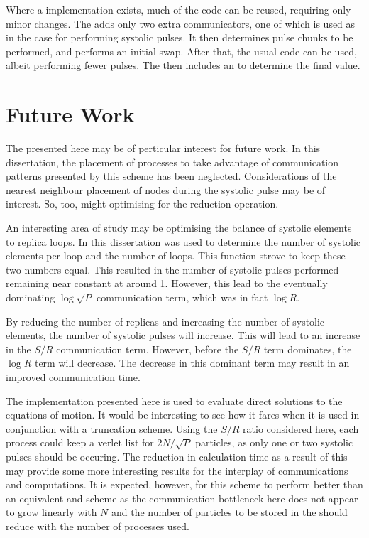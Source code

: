 Where a \systolicloop{} implementation exists, much of the code can
be reused, requiring only minor changes.
%
The \replicatedsystolicloop{} adds only two extra
communicators, one of which is used as in the \systolicloop{} case
for performing systolic pulses.
%
It then determines pulse chunks to be performed, and performs
an initial swap.
%
After that, the usual \systolicloop{} code can be used, albeit performing
fewer pulses.
%
The \replicatedsystolicloop{} then includes an \mpiallreduce{} to determine
the final value.


\section{Future Work}

The \replicatedsystolicloop{} presented here may be of perticular
interest for future work.
%
In this dissertation, the placement of processes to take advantage
of communication patterns presented by this scheme has been neglected.
%
Considerations of the nearest neighbour placement of nodes during the
systolic pulse may be of interest.
%
So, too, might optimising for the reduction operation.

An interesting area of study may be optimising the balance of
systolic elements to replica loops.
%
In this dissertation \mpidimscreate{} was used to determine the
number of systolic elements per loop and the number of loops.
%
This function strove to keep these two numbers equal.
%
This resulted in the number of systolic pulses performed remaining
near constant at around 1.
%
However, this lead to the eventually dominating $\log{\sqrt{P}}$
communication term, which was in fact $\log{R}$.

By reducing the number of replicas and increasing the number of
systolic elements, the number of systolic pulses will increase.
%
This will lead to an increase in the $S/R$ communication term.
%
However, before the $S/R$ term dominates, the $\log{R}$ term will
decrease.
%
The decrease in this dominant term may result in an improved
communication time.

The implementation presented here is used to evaluate direct
solutions to the equations of motion.
%
It would be interesting to see how it fares when it is used in
conjunction with a truncation scheme.
%
Using the $S/R$ ratio considered here, each process could
keep a verlet list for $2N/\sqrt{P}$ particles, as only one
or two systolic pulses should be occuring.
%
The reduction in calculation time as a result of this may
provide some more interesting results for the interplay
of communications and computations.
%
It is expected, however, for this scheme to perform better than
an equivalent \replicateddata{} and \verletlist{} scheme as
the communication bottleneck here does not appear to grow linearly
with $N$ and the number of particles to be stored in the \verletlist{}
should reduce with the number of processes used.


